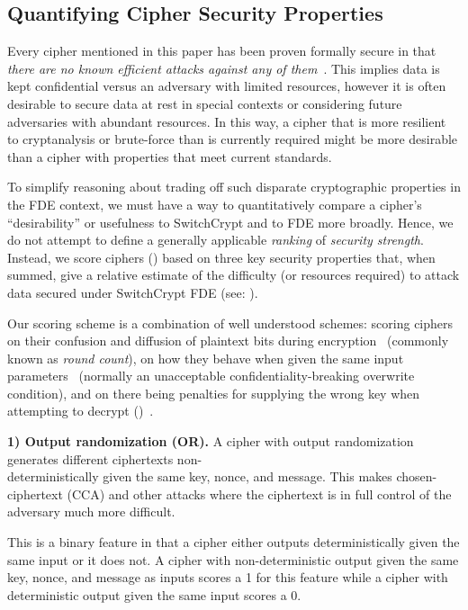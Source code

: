 \subsection{Quantifying Cipher Security Properties} \label{subsec:quantify}

Every cipher mentioned in this paper has been proven formally secure in that
\emph{there are no known efficient attacks against any of them}~\cite{All,
Ciphers, Again}. This implies data is kept confidential versus an adversary with
limited resources, however it is often desirable to secure data at rest in
special contexts or considering future adversaries with abundant resources. In
this way, a cipher that is more resilient to cryptanalysis or brute-force than
is currently required might be more desirable than a cipher with properties that
meet current standards.

To simplify reasoning about trading off such disparate cryptographic properties
in the FDE context, we must have a way to quantitatively compare a cipher's
``desirability'' or usefulness to SwitchCrypt and to FDE more broadly. Hence, we
do not attempt to define a generally applicable \textit{ranking} of
\emph{security strength}. Instead, we score ciphers () based on three key security properties that, when summed, give a
relative estimate of the difficulty (or resources required) to attack data
secured under SwitchCrypt FDE (see: ).

Our scoring scheme is a combination of well understood schemes: scoring ciphers
on their confusion and diffusion of plaintext bits during
encryption~\cite{MicrosoftCryptanalysisAES,SchneiersOnRounds} (commonly known as
\emph{round count}), on how they behave when given the same input
parameters~\cite{random-output1,Freestyle,random-output2} (normally an
unacceptable confidentiality-breaking overwrite condition), and on there being
penalties for supplying the wrong key when attempting to decrypt ()~\cite{scrypt,Freestyle,others2}.

\textbf{1) Output randomization (OR).} A cipher with output randomization
generates different ciphertexts non-\\deterministically given the same key,
nonce, and message. This makes chosen-ciphertext (CCA) and other attacks where
the ciphertext is in full control of the adversary much more difficult.

This is a binary feature in that a cipher either outputs deterministically given
the same input or it does not. A cipher with non-deterministic output given the
same key, nonce, and message as inputs scores a 1 for this feature while a
cipher with deterministic output given the same input scores a 0.

